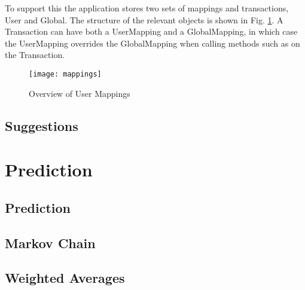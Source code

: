 To support this the application stores two sets of mappings and transactions, User and Global. The structure of the relevant objects is shown in Fig. \ref{fig:transactormappings}. A Transaction can have both a UserMapping and a GlobalMapping, in which case the UserMapping overrides the GlobalMapping when calling methods such as  on the Transaction.

\begin{figure}[h]
    \centering
    \texttt{[image: mappings]}
    \caption{Overview of User Mappings}
    \label{fig:transactormappings}
    
    \begin{comment}
[Transaction]<>*-0..1[UserMapping]
[Transaction]<>*-0..1-[GlobalMapping]
[User]<>-*[UserMapping]
[UserMapping]<>*-[UserTransactor]
[UserTransactor]<>*-[Category]
[GlobalTransactor]<>*-[Category]
[GlobalMapping]<>*-[GlobalTransactor]
    \end{comment}
\end{figure}




\subsection{Suggestions}

\section{Prediction}



\subsection{Prediction}

\subsection{Markov Chain}

\subsection{Weighted Averages}

